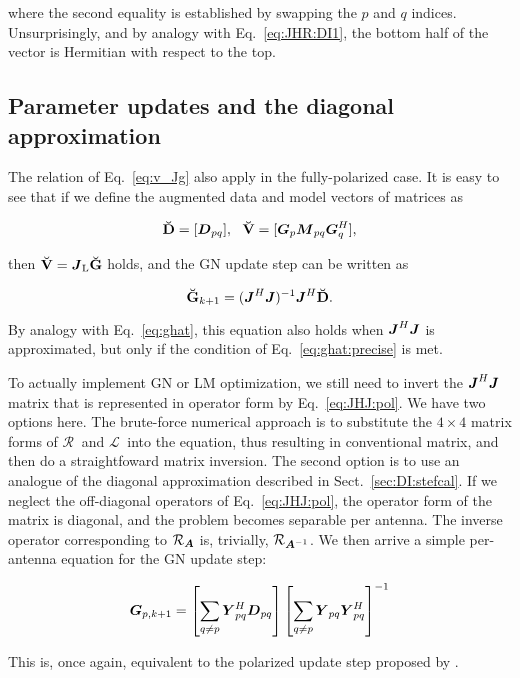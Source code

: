 \documentclass[useAMS,usenatbib]{mn2e}
\newcommand{\mat}[1]{{\bmath{#1}}}
\newcommand{\JJ}{\mat{J}} %
\newcommand{\DD}{\mat{D}}
\newcommand{\MM}{\mat{M}}
\newcommand{\GG}{\mat{G}}
\newcommand{\JHJ}{\JJ^H\JJ} %
\newcommand{\AUGx}[1]{\mathbf{\breve{#1}}}
\newcommand{\GGg}{\AUGx{G}}
\newcommand{\DDd}{\AUGx{D}}
\newcommand{\VVv}{\AUGx{V}}
\newcommand{\LEFT}{\mathrm{L}}
\newcommand{\Rop}[1]{\mathcal{R}_{{#1}}}
\newcommand{\Lop}[1]{\mathcal{L}_{{#1}}}
\newcommand{\StefCal}{{\sc StefCal}}
\begin{document}
where the second equality is established by swapping the $p$ and $q$ indices. Unsurprisingly, and by analogy with 
Eq.~\ref{eq:JHR:DI1}, the bottom half of the vector is Hermitian with respect to the top.

\subsection{Parameter updates and the diagonal approximation}

The relation of Eq.~\ref{eq:v_Jg} also apply in the fully-polarized case. It is easy to see that if we define the augmented 
data and model vectors of matrices as

\[
\DDd = [ \DD_{pq} ],~~\VVv = [ \GG_p \MM_{pq} \GG_q^H ],
\]

then $\VVv = \JJ_\LEFT \GGg$ holds, and the GN update step can be written as

\begin{equation}
\label{eq:ghat:matrix}
\GGg_{k+1} = (\JHJ)^{-1} \JJ^H \DDd.
\end{equation}

By analogy with Eq.~\ref{eq:ghat}, this equation also holds when $\JHJ$ is approximated, but only if the condition of Eq.~\ref{eq:ghat:precise} is met.

To actually implement GN or LM optimization, we still need to invert the  $\JHJ$ matrix that is represented in operator form 
by Eq.~\ref{eq:JHJ:pol}. We have two options here. The brute-force numerical approach is to substitute the 
$4\times4$ matrix forms of $\Rop{~}$ and $\Lop{~}$ into the equation, thus resulting in conventional matrix,
and then do a straightfoward matrix inversion. The second option is to use an analogue of the diagonal 
approximation described in Sect.~\ref{sec:DI:stefcal}. If we neglect the off-diagonal operators of Eq.~\ref{eq:JHJ:pol}, 
the operator form of the matrix is diagonal, and the problem becomes separable per antenna. The inverse operator 
corresponding to $\Rop{\mat{A}}$ is, trivially, $\Rop{\mat{A}^{-1}}$. We then arrive a simple per-antenna equation 
for the GN update step:

\begin{equation}
\label{eq:update:DI:diag:pol}
\GG_{p,k+1} =  
\left [ \sum\limits_{q\ne p} \YY^H_{pq} \DD_{pq} \right ] 
\left [ \sum\limits_{q\ne p} \YY_{pq} \YY^H_{pq}  \right ]^{-1}
\end{equation}

This is, once again, equivalent to the polarized {\sc \StefCal} update step proposed by \citet{Stefcal}.
\end{document}
